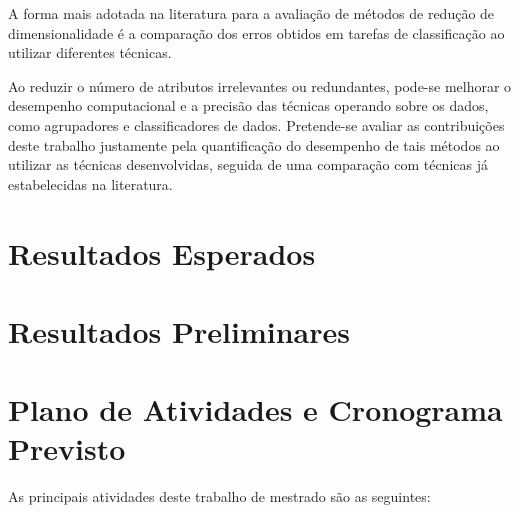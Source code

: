 A forma mais adotada na literatura para a avaliação de métodos de redução de dimensionalidade é a comparação dos erros obtidos em tarefas de classificação ao utilizar diferentes técnicas. 

Ao reduzir o número de atributos irrelevantes ou redundantes, pode-se melhorar o desempenho computacional e a precisão das técnicas operando sobre os dados, como agrupadores e classificadores de dados. Pretende-se avaliar as contribuições deste trabalho justamente pela quantificação do desempenho de tais métodos ao utilizar as técnicas desenvolvidas, seguida de uma comparação com técnicas já estabelecidas na literatura.




\section{Resultados Esperados}

\section{Resultados Preliminares}

\section{Plano de Atividades e Cronograma Previsto}\label{sec:cronograma}

As principais atividades deste trabalho de mestrado são as seguintes:

